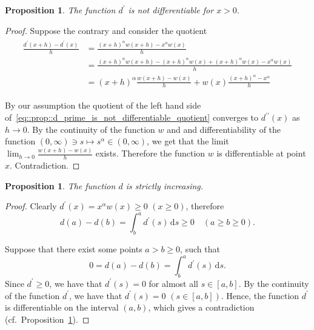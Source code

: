\documentclass[12pt]{article}
\newcommand{\dd}{\,\mathrm{d}}
\newcommand{\dprime}{{\prime\prime}}
\renewcommand{\geq}{\geqslant}
\newcommand{\mapto}{\longmapsto}
\newcommand{\paren}[1]{\! \left(#1 \right)}
\theoremstyle{plain}
\newtheorem{proposition}[theorem]{Proposition}
\theoremstyle{definition}
\theoremstyle{remark}
\begin{document}
 
\begin{proposition} \label{prop::d_prime_is_not_differentiable}
    The function $d^\prime$ is not differentiable for $x>0$.
 \end{proposition}
\begin{proof}
    Suppose the contrary and consider the quotient
    \begin{align} \label{eq::prop::d_prime_is_not_differentiable_quotient}
      \begin{split}
          \frac{d^\prime\paren{x+h} - d^\prime\paren{x}}{h} & = \frac{\paren{x+h}^\alpha w\paren{x+h} - x^\alpha w\paren{x}}{h} \\
                                                            & = \frac{\paren{x+h}^\alpha w\paren{x+h} - \paren{x+h}^\alpha w\paren{x} + \paren{x+h}^\alpha w\paren{x} - x^\alpha w\paren{x}}{h} \\
                                                            & = \paren{x+h}^\alpha \frac{w\paren{x+h} - w\paren{x}}{h} + w\paren{x} \frac{\paren{x+h}^\alpha - x^\alpha}{h}
      \end{split}
    \end{align}

    By our assumption the quotient of the left hand side of~\eqref{eq::prop::d_prime_is_not_differentiable_quotient} converges to $d^\dprime\paren{x}$ as $h \to 0$.
    By the continuity of the function $w$ and and differentiability of the function $\paren{0, \infty} \ni s \mapto s^\alpha \in \paren{0, \infty}$, we get that the limit $\lim_{h \to 0} \frac{w\paren{x+h}-w\paren{x}}{h}$ exists.
    Therefore the function $w$ is differentiable at point $x$.
    Contradiction.
\end{proof}

\begin{proposition} \label{prop::d_is_increasing}
    The function $d$ is strictly increasing.
\end{proposition}
\begin{proof}
    Clearly $d^\prime\paren{x} =x^\alpha w\paren{x} \geq 0$ $\paren{x \geq 0}$, therefore
    \begin{equation*} %
        d\paren{a} - d\paren{b} = \int^a_b d^\prime\paren{s} \dd s \geq 0 \quad \paren{a \geq b \geq 0}.
    \end{equation*}

    Suppose that there exist some points $a > b \geq 0$, such that
    \begin{equation*}
        0 = d\paren{a} - d\paren{b} = \int^a_b d^\prime\paren{s} \dd s.
    \end{equation*}
    Since $d^\prime \geq 0$, we have that $d^\prime\paren{s} = 0$ for almost all $s \in \left[a, b\right]$.
    By the continuity of the function $d^\prime$, we have that $d^\prime\paren{s} = 0$ $\paren{s \in  \left[a, b\right]}$.
    Hence, the function $d^\prime$ is differentiable on the interval $\paren{a, b}$, which gives a contradiction (cf.\ Proposition~\ref{prop::d_prime_is_not_differentiable}).
\end{proof}
\end{document}
